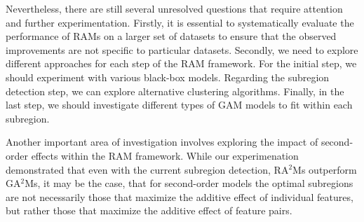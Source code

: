 \documentclass[runningheads]{llncs}
\begin{document}
Nevertheless, there are still several unresolved questions that require attention and further experimentation.
Firstly, it is essential to systematically evaluate the performance of RAMs on a larger set of datasets to ensure that the observed improvements are not specific to particular datasets.
Secondly, we need to explore different approaches for each step of the RAM framework.
For the initial step, we should experiment with various black-box models.
Regarding the subregion detection step, we can explore alternative clustering algorithms.
Finally, in the last step, we should investigate different types of GAM models to fit within each subregion.

Another important area of investigation involves exploring the impact of second-order effects within the RAM framework.
While our experimenation demonstrated that even with the current subregion detection, RA$^2$Ms outperform GA$^2$Ms,
it may be the case, that for second-order models the optimal subregions are not necessarily those that maximize the additive effect of individual features,
but rather those that maximize the additive effect of feature pairs.



\end{document}
